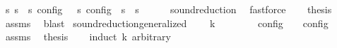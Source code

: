 \begin{isabellebody}
\ {\isacartoucheopen}{\isasymforall}s\ s\ {\isacharparenleft}{\isasymlbrakk}\ s\ {\isasymrbrakk}\isactrlsub c\isactrlsub o\isactrlsub n\isactrlsub f\isactrlsub i\isactrlsub g\ {\isasymsubseteq}\ {\isasymlbrakk}\ s\ {\isasymrbrakk}\isactrlsub c\isactrlsub o\isactrlsub n\isactrlsub f\isactrlsub i\isactrlsub g{\isacharparenright}\ {\isasymor}\ {\isasymnot}{\isacharparenleft}s\ {\isasymhookrightarrow}\ s\isanewline
\ \ \ \ \isamarkupfalse%
\ sound{\isacharunderscore}reduction\ \isamarkupfalse%
\ fastforce\isanewline
\ \ \isamarkupfalse%
\ {\isacharquery}thesis\ \isamarkupfalse%
\ assms\ \isamarkupfalse%
\ blast\isanewline
{}\isamarkupfalse%
%
\endisatagproof
{\isafoldproof}%
%
\isadelimproof
\isanewline
%
\endisadelimproof
\isanewline
{}\isamarkupfalse%
\ sound{\isacharunderscore}reduction{\isacharunderscore}generalized{\isacharcolon}\isanewline
\ \ \ {\isacartoucheopen}{\isasymS}\ {\isasymhookrightarrow}\isactrlbsup k\isactrlesup \ {\isasymS}\isanewline
\ \ \ \ \ {\isacartoucheopen}{\isasymlbrakk}\ {\isasymS}\ {\isasymrbrakk}\isactrlsub c\isactrlsub o\isactrlsub n\isactrlsub f\isactrlsub i\isactrlsub g\ {\isasymsupseteq}\ {\isasymlbrakk}\ {\isasymS}\ {\isasymrbrakk}\isactrlsub c\isactrlsub o\isactrlsub n\isactrlsub f\isactrlsub i\isactrlsub g{\isacartoucheclose}\isanewline
%
\isadelimproof
%
\endisadelimproof
%
\isatagproof
{}\isamarkupfalse%
\ {\isacharminus}\isanewline
\ \ \isamarkupfalse%
\ assms\ \isamarkupfalse%
\ {\isacharquery}thesis\isanewline
\ \ \isamarkupfalse%
\ {\isacharparenleft}induct\ k\ arbitrary{\isacharcolon}\ {\isasymS}\isanewline
\ \ \ \ \isamarkupfalse%
\ {}\isanewline
\ \ \ \ \ \ \isamarkupfalse%
\ {\isacharasterisk}{\isacharcolon}\ {\isacartoucheopen}{\isasymS}\ {\isasymhookrightarrow}\isactrlesup \ {\isasymS}\ {\isasymLongrightarrow}\ {\isasymS}\ {\isacharequal}\ {\isasymS}\ \isamarkupfalse%

\end{isabellebody}

